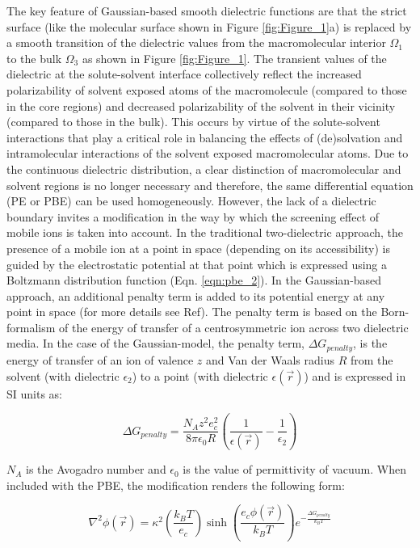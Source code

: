 \documentclass[9pt,tutorial]{livecoms}
\begin{document}
The key feature of Gaussian-based smooth dielectric functions are that the strict surface (like the molecular surface shown in Figure \ref{fig:Figure_1}a) is replaced by a smooth transition of the dielectric values from the macromolecular interior $ \Omega_1 $ to the bulk $ \Omega_3 $ as shown in Figure \ref{fig:Figure_1}. The transient values of the dielectric at the solute-solvent interface collectively reflect the increased polarizability of solvent exposed atoms of the macromolecule (compared to those in the core regions) and decreased polarizability of the solvent in their vicinity (compared to those in the bulk). This occurs by virtue of the solute-solvent interactions that play a critical role in balancing the effects of (de)solvation and intramolecular interactions of the solvent exposed macromolecular atoms. 
Due to the continuous dielectric distribution, a clear distinction of macromolecular and solvent regions is no longer necessary and therefore, the same differential equation (PE or PBE) can be used homogeneously. However, the lack of a dielectric boundary invites a modification in the way by which the screening effect of mobile ions is taken into account. In the traditional two-dielectric approach, the presence of a mobile ion at a point in space (depending on its accessibility) is guided by the electrostatic potential at that point which is expressed using a Boltzmann distribution function (Eqn. \ref{eqn:pbe_2}). In the Gaussian-based approach, an additional penalty term is added to its potential energy at any point in space (for more details see Ref\cite{jia2017treating}). The penalty term is based on the Born-formalism of the energy of transfer of a centrosymmetric ion across two dielectric media. In the case of the Gaussian-model, the penalty term, $ \Delta G_{penalty} $, is the energy of transfer of an ion of valence $ z $ and Van der Waals radius $ R $ from the solvent (with dielectric $ \epsilon_2 $) to a point  (with dielectric $ \epsilon(\Vec{r})$) and is expressed in SI units as:

\begin{equation}
\Delta G_{penalty} = \frac{N_Az^2e_c^2}{8\pi\epsilon_0 R} \left( \frac{1}{\epsilon(\Vec{r})} - \frac{1}{\epsilon_2} \right)
\end{equation}

$ N_A $ is the Avogadro number and $ \epsilon_0 $ is the value of permittivity of vacuum. When included with the PBE, the modification renders the following form:

\begin{equation}
\nabla^2\phi(\Vec{r}) = \kappa^2 \left (\frac{k_BT}{e_c} \right) \sinh\left({\frac{e_c\phi(\Vec{r})}{k_BT}} \right) e^{-\frac{\Delta G_{penalty}}{k_B T}}
\end{equation}
\end{document}
